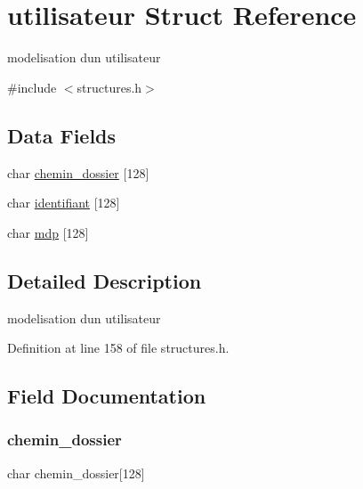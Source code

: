 \hypertarget{structutilisateur}{}\section{utilisateur Struct Reference}
\label{structutilisateur}


modelisation d\textquotesingle{}un utilisateur  




{\ttfamily \#include $<$structures.\+h$>$}

\subsection*{Data Fields}
\begin{DoxyCompactItemize}
\item 
char \hyperlink{structutilisateur_a753cd8189e0a1f94f7d7e4d65a343004}{chemin\+\_\+dossier} \mbox{[}128\mbox{]}
\item 
char \hyperlink{structutilisateur_aa9f89c9a3512c982fed4d4789019bdb3}{identifiant} \mbox{[}128\mbox{]}
\item 
char \hyperlink{structutilisateur_a8af71e7f7d7c4089896f8f6498d53a22}{mdp} \mbox{[}128\mbox{]}
\end{DoxyCompactItemize}


\subsection{Detailed Description}
modelisation d\textquotesingle{}un utilisateur 

Definition at line 158 of file structures.\+h.



\subsection{Field Documentation}
\hypertarget{structutilisateur_a753cd8189e0a1f94f7d7e4d65a343004}{}\label{structutilisateur_a753cd8189e0a1f94f7d7e4d65a343004} 
\subsubsection{\texorpdfstring{chemin\+\_\+dossier}{chemin\_dossier}}
{\footnotesize\ttfamily char chemin\+\_\+dossier\mbox{[}128\mbox{]}}



